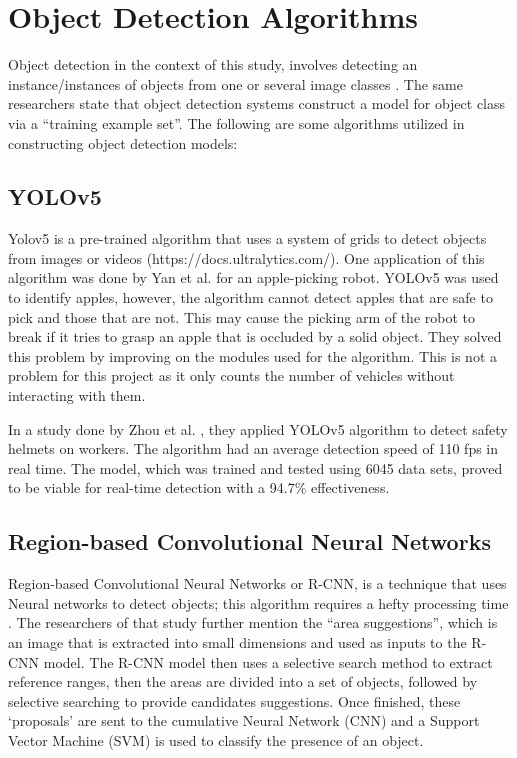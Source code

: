 \section{Object Detection Algorithms}
Object detection in the context of this study, involves detecting an instance/instances of objects from one or several image classes \cite{Amit_Felzenszwalb_Girshick_2020}. The same researchers state that object detection systems construct a model for object class via a “training example set”. The following are some algorithms utilized in constructing object detection models:

\subsection{YOLOv5}

Yolov5 is a pre-trained algorithm that uses a system of grids to detect objects from images or videos (https://docs.ultralytics.com/). 
One application of this algorithm was done by Yan et al. \citeyear{yan_2021} for an apple-picking robot. YOLOv5 was used to identify apples, however, the algorithm cannot detect apples that are safe to pick and those that are not. This may cause the picking arm of the robot to break if it tries to grasp an apple that is occluded by a solid object. They solved this problem by improving on the modules used for the algorithm. This is not a problem for this project as it only counts the number of vehicles without interacting with them. 

In a study done by Zhou et al. \citeyear{zhou_2021}, they applied YOLOv5 algorithm to detect safety helmets on workers. The algorithm had an average detection speed of 110 fps in real time. The model, which was trained and tested using 6045 data sets, proved to be viable for real-time detection with a 94.7\% effectiveness.

\subsection{Region-based Convolutional Neural Networks}

Region-based Convolutional Neural Networks or R-CNN, is a technique that uses Neural networks to detect objects; this algorithm requires a hefty processing time \cite{Cuong_Trinh_Meesad_Nguyen_2022}. The researchers of that study further mention the “area suggestions”, which is an image that is extracted into small dimensions and used as inputs to the R-CNN model. The R-CNN model then uses a selective search method to extract reference ranges, then the areas are divided into a set of objects, followed by selective searching to provide candidates suggestions. Once finished, these ‘proposals’ are sent to the cumulative Neural Network (CNN)  and a Support Vector Machine (SVM) is used to classify the presence of an object.

